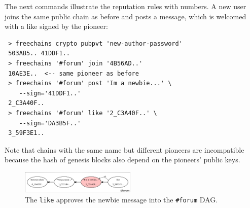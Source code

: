 \documentclass[10pt,journal,compsoc]{IEEEtran}
\begin{document}
The next commands illustrate the reputation rules with numbers.
A new user joins the same public chain as before and posts a message, which is
welcomed with a like signed by the pioneer:

{\footnotesize
\begin{verbatim}
 > freechains crypto pubpvt 'new-author-password'
 503AB5.. 41DDF1..
 > freechains '#forum' join '4B56AD..'
 10AE3E..  <-- same pioneer as before
 > freechains '#forum' post 'Im a newbie...' \
    --sign='41DDF1..'
 2_C3A40F..
 > freechains '#forum' like '2_C3A40F..' \
    --sign='DA3B5F..'
 3_59F3E1..
\end{verbatim}
}

Note that chains with the same name but different pioneers are incompatible
because the hash of genesis blocks also depend on the pioneers' public keys.

\begin{figure}
\centering
\includegraphics[width=0.49\textwidth]{forum.png}
\caption{
    The \texttt{like} approves the newbie message into the \texttt{\#forum} DAG.
}
\label{fig.forum}
\end{figure}
\end{document}
